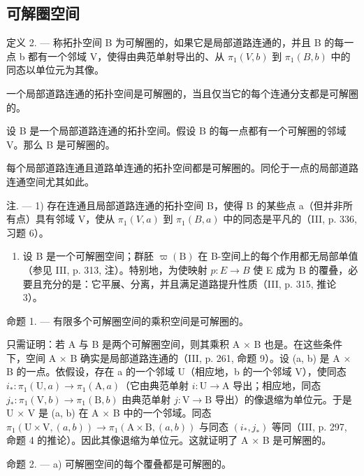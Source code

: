 \subsection{可解圈空间}

定义 2. --- 称拓扑空间 B 为可解圈的，如果它是局部道路连通的，并且 B 的每一点 b 都有一个邻域 V，使得由典范单射导出的、从 \(\pi_1(V,b)\) 到 \(\pi_1(B,b)\) 中的同态以单位元为其像。

一个局部道路连通的拓扑空间是可解圈的，当且仅当它的每个连通分支都是可解圈的。

设 B 是一个局部道路连通的拓扑空间。假设 B 的每一点都有一个可解圈的邻域 V。那么 B 是可解圈的。

每个局部道路连通且道路单连通的拓扑空间都是可解圈的。同伦于一点的局部道路连通空间尤其如此。

注. --- 1) 存在连通且局部道路连通的拓扑空间 B，使得 B 的某些点 a（但并非所有点）具有邻域 V，使从 \(\pi_{1}(V,a)\) 到 \(\pi_{1}(B,a)\) 中的同态是平凡的（III, p. 336, 习题 6）。

\begin{enumerate}
\def\labelenumi{\arabic{enumi})}
\setcounter{enumi}{1}
\tightlist
\item
  设 B 是一个可解圈空间；群胚 \(\varpi(\mathrm{B})\) 在 B-空间上的每个作用都无局部单值（参见 III, p. 313, 注）。特别地，为使映射 \(p: E \rightarrow B\) 使 E 成为 B 的覆叠，必要且充分的是：它平展、分离，并且满足道路提升性质（III, p. 315, 推论 3）。
\end{enumerate}

命题 1. --- 有限多个可解圈空间的乘积空间是可解圈的。

只需证明：若 A 与 B 是两个可解圈空间，则其乘积 A × B 也是。在这些条件下，空间 A × B 确实是局部道路连通的（III, p. 261, 命题 9）。设 (a, b) 是 A × B 的一点。依假设，存在 a 的一个邻域 U（相应地，b 的一个邻域 V），使同态 \(i_* \colon \pi_1(\mathrm{U}, a) \to \pi_1(\mathrm{A}, a)\)（它由典范单射 \(i \colon \mathrm{U} \to \mathrm{A}\) 导出；相应地，同态 \(j_* \colon \pi_1(\mathrm{V}, b) \to \pi_1(\mathrm{B}, b)\) 由典范单射 \(j \colon \mathrm{V} \to \mathrm{B}\) 导出）的像退缩为单位元。于是 U × V 是 (a, b) 在 A × B 中的一个邻域。同态 \(\pi_1(\mathrm{U} \times \mathrm{V}, (a, b)) \to \pi_1(\mathrm{A} \times \mathrm{B}, (a, b))\) 与同态 \((i_*, j_*)\) 等同（III, p. 297, 命题 4 的推论）。因此其像退缩为单位元。这就证明了 A × B 是可解圈的。

命题 2. --- a) 可解圈空间的每个覆叠都是可解圈的。

